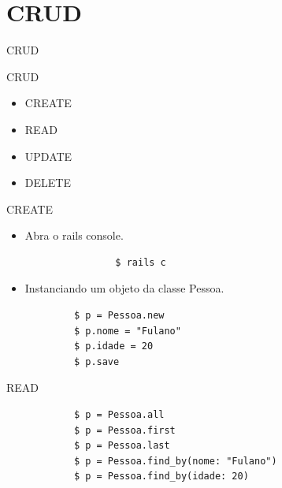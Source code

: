 \documentclass{beamer}
\begin{document}
\section{CRUD}
\begin{frame}[fragile]{CRUD}
	\begin{block} {\LARGE CRUD}
		\begin{itemize} \itemsep 2em
			\item{\LARGE CREATE}
			\item{\LARGE READ}
			\item{\LARGE UPDATE}
			\item{\LARGE DELETE}				
		\end{itemize}
	\end{block}
\end{frame}

\begin{frame}[fragile]{CREATE}
\begin{itemize} \itemsep 2em
\item{\Large Abra o rails console.}
	\begin{block}{}
				\begin{verbatim}			
				$ rails c
				\end{verbatim}
				\end{block}
\item{\Large Instanciando um objeto da classe Pessoa.}
\end{itemize}
	\begin{block}{}
			\begin{verbatim}			
			$ p = Pessoa.new
			$ p.nome = "Fulano"
			$ p.idade = 20
			$ p.save
			\end{verbatim}
			\end{block}
\end{frame}

\begin{frame}[fragile]{READ }
	\begin{block}{}
			\begin{verbatim}			
			$ p = Pessoa.all
			$ p = Pessoa.first
			$ p = Pessoa.last
			$ p = Pessoa.find_by(nome: "Fulano")
			$ p = Pessoa.find_by(idade: 20)
			\end{verbatim}
			\end{block}
\end{frame}
\end{document}
